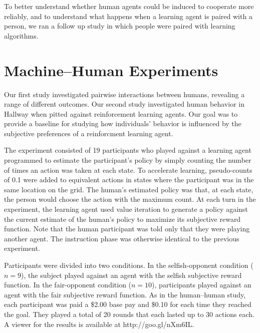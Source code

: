 \documentclass[letterpaper]{article}
\begin{document}
To better understand whether human agents could be induced to
cooperate more reliably, and to understand what happens when a
learning agent is paired with a person, we ran a follow up study in
which people were paired with learning algorithms.


\section{Machine--Human Experiments}

Our first study investigated pairwise interactions between humans,
revealing a range of different outcomes. Our second study investigated
 human behavior in Hallway when pitted against reinforcement learning
agents. Our goal was to provide a baseline for studying how individuals'
behavior is influenced by the subjective preferences of a reinforcment learning
agent.

The experiment consisted of 19 participants who played against a
learning agent programmed to estimate the participant's policy by
simply counting the number of times an action was taken at each
state. To accelerate learning, pseudo-counts of 0.1 were added to
equivalent actions in states where the participant was in the same
location on the grid. The human's estimated policy was that, at each
state, the person would choose the action with the maximum count. At
each turn in the experiment, the learning agent used value iteration
to generate a policy against the current estimate of the human's
policy to maximize its subjective reward function. Note that the human
participant was told only that they were playing another agent. The instruction phase was otherwise identical to the previous experiment.

Participants were divided into two conditions. In the selfish-opponent
condition ($n=9$), the subject played against an agent with the
selfish subjective reward function. In the fair-opponent condition
($n=10$), participants played against an agent with the fair
subjective reward function. As in the human--human study, each
participant was paid a \$2.00 base pay and \$0.10 for each time they
reached the goal. They played a total of 20 rounds that each lasted up
to 30 actions each. A viewer for the results is available at
http://goo.gl/nXm6IL.
\end{document}
